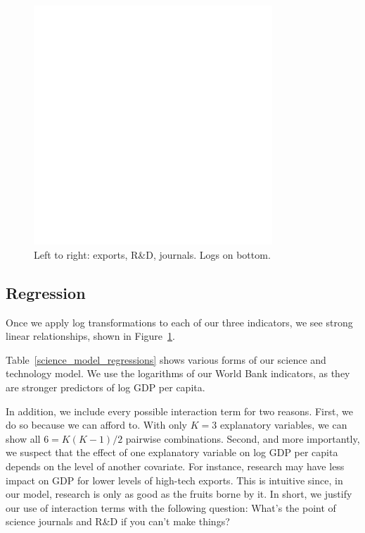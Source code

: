 \documentclass[11pt]{article}
\begin{document}
\begin{figure}[!ht]
  \centering
  \includegraphics[width=0.8\textwidth]{images/science_model_scatter}
  \caption{\label{science_model_scatter}Left to right: exports, R\&D, journals. Logs on bottom.}
\end{figure}

\subsection{Regression}

Once we apply log transformations to each of our three indicators, we see strong linear relationships, shown in Figure~\ref{science_model_scatter}.

Table~\ref{science_model_regressions} shows various forms of our science and technology model. We use the logarithms of our World Bank indicators, as they are stronger predictors of log GDP per capita.

In addition, we include every possible interaction term for two reasons.
First, we do so because we can afford to. With only $K=3$ explanatory variables, we can show all $6 = K(K-1)/2$ pairwise combinations. 
Second, and more importantly, we suspect that the effect of one explanatory variable on log GDP per capita depends on the level of another covariate. For instance, research may have less impact on GDP for lower levels of high-tech exports. This is intuitive since, in our model, research is only as good as the fruits borne by it. In short, we justify our use of interaction terms with the following question: What's the point of science journals and R\&D if you can't make things?
\end{document}
